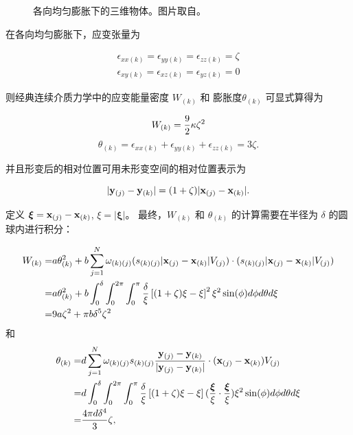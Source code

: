 {{{\begin{figure}[htbp!]
  \caption{\label{pdm_isotropic_expansion}
           各向均匀膨胀下的三维物体。图片取自。
          }
\end{figure}

在各向均匀膨胀下，应变张量为

\begin{eqnarray}
  \epsilon_{xx(k)} =  \epsilon_{yy(k)} = \epsilon_{zz(k)} = \zeta\\
  \epsilon_{xy(k)} =  \epsilon_{xz(k)} = \epsilon_{yz(k)} = 0
\end{eqnarray}

则经典连续介质力学中的应变能量密度 $W_{(k)}$ 和 膨胀度$\theta_{(k)}$ 可显式算得为

\begin{equation}
W_{(k)} = \frac{9}{2}\kappa\zeta^2\\
\label{eq:33}
\end{equation}
\begin{equation}
\theta_{(k)} = \epsilon_{xx(k)}+\epsilon_{yy(k)}+\epsilon_{zz(k)} = 3\zeta.
\label{eq:34}
\end{equation}

并且形变后的相对位置可用未形变空间的相对位置表示为

\begin{equation}
|\mathbf{y}_{(j)} - \mathbf{y}_{(k)}| = (1+\zeta)|\mathbf{x}_{(j)} - \mathbf{x}_{(k)}|.
\label{eq:35}
\end{equation}

定义 $\bm{\xi} = \mathbf{x}_{(j)} - \mathbf{x}_{(k)}$, $\xi = |\bm{\xi}|$。
最终，$W_{(k)}$ 和 $\theta_{(k)}$ 的计算需要在半径为 $\delta$ 的圆球内进行积分：

\begin{equation}
\begin{aligned}
W_{(k)} =& a\theta_{(k)}^2
           +b\sum_{j=1}^{N}\omega_{(k)(j)}(s_{(k)(j)}|\mathbf{x}_{(j)}-\mathbf{x}_{(k)}|V_{(j)})\cdot(s_{(k)(j)}|\mathbf{x}_{(j)}-\mathbf{x}_{(k)}|V_{(j)})\\
        =& a\theta_{(k)}^2
           +b\int_0^\delta\int_0^{2\pi}\int_0^{\pi}\frac{\delta}{\xi}\left[(1+\zeta)\xi-\xi\right]^2\xi^2\sin(\phi)d\phi d\theta d\xi\\
        =& 9a\zeta^2+\pi b\delta^5\zeta^2
\end{aligned}
\label{eq:36}
\end{equation}
和
\begin{equation}
\begin{aligned}
\theta_{(k)} =& d\sum_{j=1}^{N}\omega_{(k)(j)}s_{(k)(j)}\frac{\mathbf{y}_{(j)} - \mathbf{y}_{(k)}}{|\mathbf{y}_{(j)} - \mathbf{y}_{(k)}|}\cdot(\mathbf{x}_{(j)}-\mathbf{x}_{(k)})V_{(j)}\\
        =& d\int_0^\delta\int_0^{2\pi}\int_0^{\pi}\frac{\delta}{\xi}\left[(1+\zeta)\xi-\xi\right](\frac{\bm{\xi}}{\xi}\cdot\frac{\bm{\xi}}{\xi})\xi^2\sin(\phi)d\phi d\theta d\xi\\
        =& \frac{4\pi d\delta^4}{3}\zeta,
\end{aligned}
\label{eq:37}
\end{equation}

}}}
